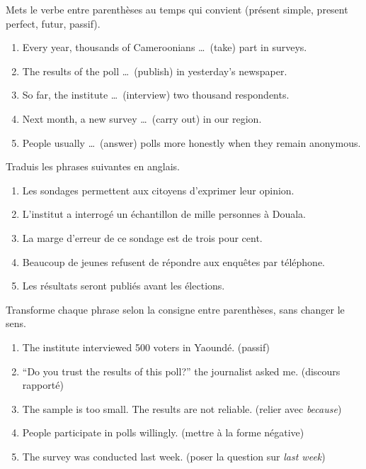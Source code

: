 \documentclass[11pt]{article}
\newcounter{popsec}
\newcounter{popsub}
\newcommand{\courssub}[1]{%
  \stepcounter{popsub}%
  \par\vspace{9pt}\noindent{\popxbold\fontsize{11.5}{13}\selectfont\color{popink}{\color{poporange}\thepopsec.\thepopsub}\hspace{6pt}#1}\par\nopagebreak\vspace{4pt}
}
\begin{document}
\begin{exercice}
Mets le verbe entre parenthèses au temps qui convient (présent simple, present perfect, futur, passif).
\begin{enumerate}
\item Every year, thousands of Cameroonians \ldots\ (take) part in surveys.
\item The results of the poll \ldots\ (publish) in yesterday's newspaper.
\item So far, the institute \ldots\ (interview) two thousand respondents.
\item Next month, a new survey \ldots\ (carry out) in our region.
\item People usually \ldots\ (answer) polls more honestly when they remain anonymous.
\end{enumerate}
\end{exercice}

\courssub{Je m'entraîne}

\begin{exercice}[Traduction]
Traduis les phrases suivantes en anglais.
\begin{enumerate}
\item Les sondages permettent aux citoyens d'exprimer leur opinion.
\item L'institut a interrogé un échantillon de mille personnes à Douala.
\item La marge d'erreur de ce sondage est de trois pour cent.
\item Beaucoup de jeunes refusent de répondre aux enquêtes par téléphone.
\item Les résultats seront publiés avant les élections.
\end{enumerate}
\end{exercice}

\begin{exercice}
Transforme chaque phrase selon la consigne entre parenthèses, sans changer le sens.
\begin{enumerate}
\item The institute interviewed 500 voters in Yaoundé. (passif)
\item “Do you trust the results of this poll?” the journalist asked me. (discours rapporté)
\item The sample is too small. The results are not reliable. (relier avec \emph{because})
\item People participate in polls willingly. (mettre à la forme négative)
\item The survey was conducted last week. (poser la question sur \emph{last week})
\end{enumerate}
\end{exercice}
\end{document}
